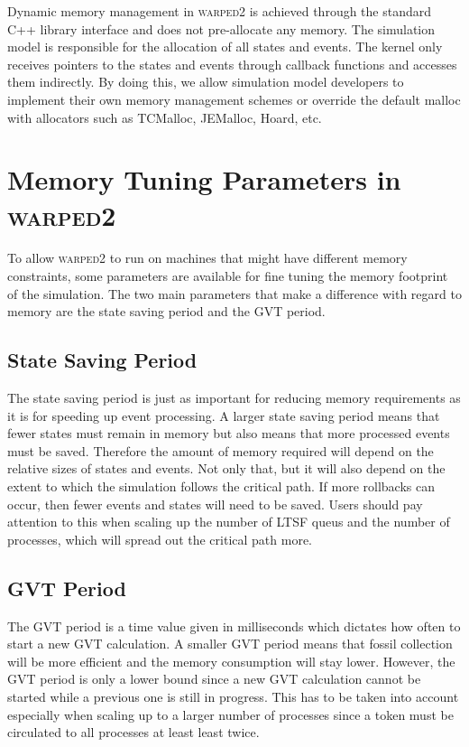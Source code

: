 \documentclass[11pt]{book}
\begin{document}
Dynamic memory management in \textsc{warped2} is achieved through the standard C++ library
interface and does not pre-allocate any memory. The simulation model is responsible for the
allocation of all states and events. The kernel only receives pointers to the states and events
through callback functions and accesses them indirectly. By doing this, we allow simulation model
developers to implement their own memory management schemes or override the default malloc with
allocators such as TCMalloc, JEMalloc, Hoard, etc.

\section{Memory Tuning Parameters in \textsc{warped2}}

To allow \textsc{warped2} to run on machines that might have different memory constraints,
some parameters are available for fine tuning the memory footprint of the simulation. The
two main parameters that make a difference with regard to memory are the state saving period
and the GVT period.

\subsection{State Saving Period}

The state saving period is just as important for reducing memory requirements as it is for
speeding up event processing. A larger state saving period means that fewer states must remain
in memory but also means that more processed events must be saved. Therefore the amount of
memory required will depend on the relative sizes of states and events. Not only that, but it
will also depend on the extent to which the simulation follows the critical path. If more
rollbacks can occur, then fewer events and states will need to be saved. Users should pay attention
to this when scaling up the number of LTSF queus and the number of processes, which will spread
out the critical path more.

\subsection{GVT Period}

The GVT period is a time value given in milliseconds which dictates how often to start a new
GVT calculation. A smaller GVT period means that fossil collection will be more efficient and
the memory consumption will stay lower. However, the GVT period is only a lower bound since
a new GVT calculation cannot be started while a previous one is still in progress. This has to
be taken into account especially when scaling up to a larger number of processes since a token
must be circulated to all processes at least least twice.
\end{document}
